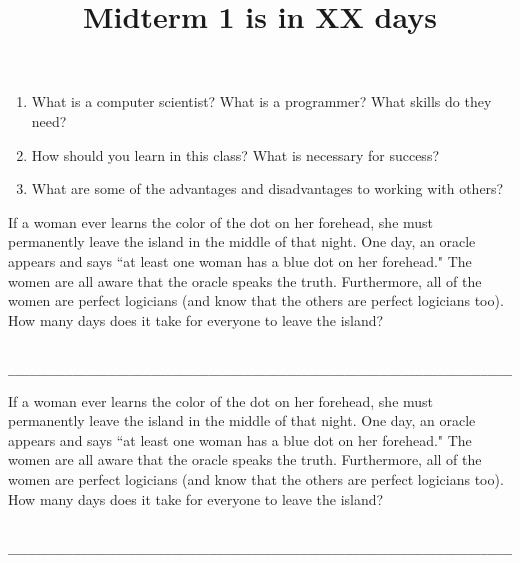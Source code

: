 \documentclass[twoside]{article}
\title{\sc Midterm 1 is in XX days}
\begin{document}
\maketitle

\begin{enumerate}
\begin{enumerate}
\item What is a computer scientist? What is a programmer? What skills do they need?
\vspace{2.3cm}
\item How should you learn in this class? What is necessary for success?
\vspace{2.3cm}
\item What are some of the advantages and disadvantages to working with others?
\vspace{2.3cm}
\end{enumerate}

 \newline\newline If a woman ever learns the color of the dot on her forehead, she must permanently leave the island in the middle of that night. \newline\newline One day, an oracle appears and says ``at least one woman has a blue dot on her forehead." The women are all aware that the oracle speaks the truth. Furthermore, all of the women are perfect logicians (and know that the others are perfect logicians too). How many days does it take for everyone to leave the island?

\begin{lstlisting}

__________________________________________________________________________
\end{lstlisting}

 \newline\newline If a woman ever learns the color of the dot on her forehead, she must permanently leave the island in the middle of that night. \newline\newline One day, an oracle appears and says ``at least one woman has a blue dot on her forehead." The women are all aware that the oracle speaks the truth. Furthermore, all of the women are perfect logicians (and know that the others are perfect logicians too). How many days does it take for everyone to leave the island?

\begin{lstlisting}

__________________________________________________________________________
\end{lstlisting}

\end{enumerate}
\end{document}
